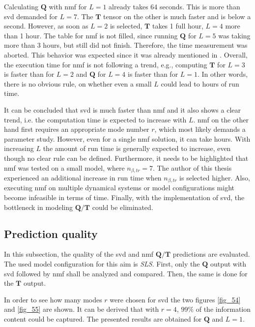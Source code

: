 Calculating $\bm Q$ with \gls{nmf} for $L=1$ already takes 64 seconds. 
This is more than \gls{svd} demanded for $L=7$. 
The $\bm T$ tensor on the other is much faster and is below a second.
However, as soon as $L=2$ is selected, $\bm T$ takes 1 full hour, $L=4$ more than 1 hour.
The table for \gls{nmf} is not filled, since running $\bm Q$ for $L=5$ was taking more than 3 hours, but still did not finish. 
Therefore, the time measurement was aborted. 
This behavior was expected since it was already mentioned in \cite{Max2021}.
Overall, the execution time for \gls{nmf} is not following a trend, e.g., computing $\bm T$ for $L=3$ is faster than for $L=2$ and $\bm Q$ for $L=4$ is faster than for $L=1$.
In other words, there is no obvious rule, on whether even a small $L$ could lead to hours of run time.\newline 

It can be concluded that \gls{svd} is much faster than \gls{nmf} and it also shows a clear trend, i.e. the computation time is expected to increase with $L$.
\gls{nmf} on the other hand first requires an appropriate mode number $r$, which most likely demands a parameter study.
However, even for a single \gls{nmf} solution, it can take hours.
With increasing $L$ the amount of run time is generally expected to increase, even though no clear rule can be defined.
Furthermore, it needs to be highlighted that \gls{nmf} was tested on a small model, where $n_{\beta,tr} = 7$. The author of this thesis experienced an additional increase in run time when $n_{\beta,tr}$ is selected higher. 
Also, executing \gls{nmf} on multiple dynamical systems or model configurations might become infeasible in terms of time.
Finally, with the implementation of \gls{svd}, the bottleneck in modeling $\bm Q / \bm T$ could be eliminated.


\subsection{Prediction quality}
\label{subsec_3_3_2_SVD_Quality}
In this subsection, the quality of the \gls{svd} and \gls{nmf} $\bm Q / \bm T$ predictions are evaluated. 
The used model configuration for this aim is \emph{SLS}.
First, only the $\bm Q$ output with \gls{svd} followed by \gls{nmf} shall be analyzed and compared. Then, the same is done for the $\bm T$ output.\newline


In order to see how many modes $r$ were chosen for \gls{svd} the two figures \ref{fig_54} and \ref{fig_55} are shown. 
It can be derived that with $r = 4$, $99 \%$ of the information content could be captured. The presented results are obtained for $\bm Q$ and $L =1$.\newline

